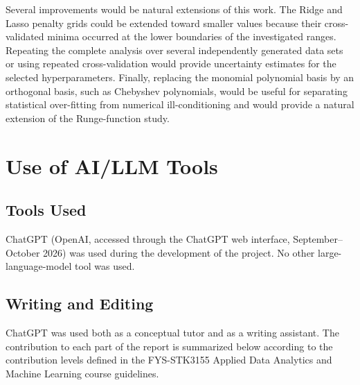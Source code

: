 \documentclass[aps,rmp,reprint,amsmath,amssymb,graphicx,longbibliography]{revtex4-1}
\begin{document}
Several improvements would be natural extensions of this work. The Ridge and
Lasso penalty grids could be extended toward smaller values because their
cross-validated minima occurred at the lower boundaries of the investigated
ranges. Repeating the complete analysis over several independently generated
data sets or using repeated cross-validation would provide uncertainty
estimates for the selected hyperparameters. Finally, replacing the monomial
polynomial basis by an orthogonal basis, such as Chebyshev polynomials, would
be useful for separating statistical over-fitting from numerical
ill-conditioning and would provide a natural extension of the Runge-function
study.


\appendix
\section{Use of AI/LLM Tools}

\subsection{Tools Used}

ChatGPT (OpenAI, accessed through the ChatGPT web interface,
September--October 2026) was used during the development of the project.
No other large-language-model tool was used.

\subsection{Writing and Editing}

ChatGPT was used both as a conceptual tutor and as a writing assistant.
The contribution to each part of the report is summarized below according
to the contribution levels defined in the FYS-STK3155 Applied Data Analytics and Machine Learning course guidelines.
\end{document}

